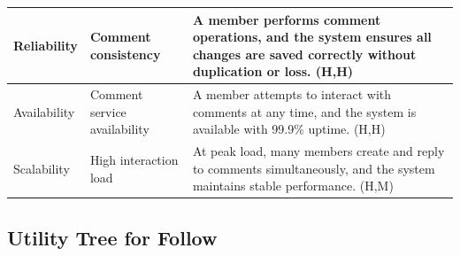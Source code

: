 \documentclass{article}
\begin{document}
\begin{table}[H]
\begin{tabular}{|p{3cm}|p{4cm}|p{7cm}|}
        Reliability
                                   & Comment consistency
                                   & A member performs comment operations, and the system ensures all changes are saved correctly without duplication or loss. (H,H)                                \\
        \hline

        Availability
                                   & Comment service availability
                                   & A member attempts to interact with comments at any time, and the system is available with 99.9\% uptime. (H,H)                                                 \\
        \hline

        Scalability
                                   & High interaction load
                                   & At peak load, many members create and reply to comments simultaneously, and the system maintains stable performance. (H,M)                                     \\
        \hline
    \end{tabular}
\end{table}

\subsection{Utility Tree for Follow}
\end{document}
